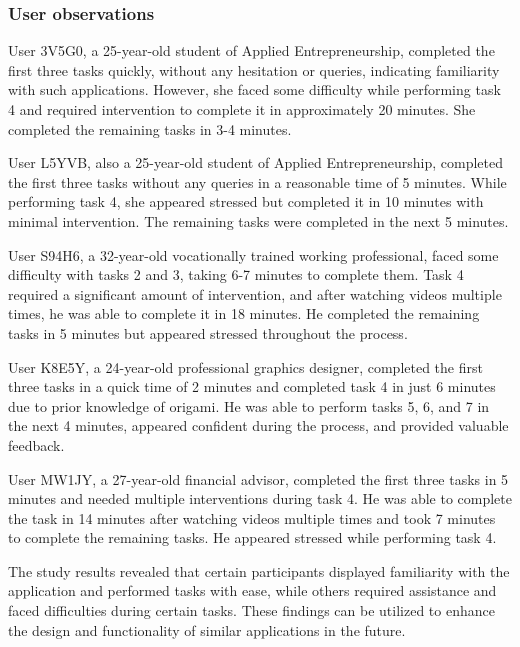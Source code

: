 \documentclass[conference,onecolumn]{IEEEtran}
\begin{document}
        \subsubsection{User observations}\hfill
            
            User 3V5G0, a 25-year-old student of Applied Entrepreneurship, completed the first three tasks quickly, without any hesitation or queries, indicating familiarity with such applications. However, she faced some difficulty while performing task 4 and required intervention to complete it in approximately 20 minutes. She completed the remaining tasks in 3-4 minutes.

            User L5YVB, also a 25-year-old student of Applied Entrepreneurship, completed the first three tasks without any queries in a reasonable time of 5 minutes. While performing task 4, she appeared stressed but completed it in 10 minutes with minimal intervention. The remaining tasks were completed in the next 5 minutes.

            User S94H6, a 32-year-old vocationally trained working professional, faced some difficulty with tasks 2 and 3, taking 6-7 minutes to complete them. Task 4 required a significant amount of intervention, and after watching videos multiple times, he was able to complete it in 18 minutes. He completed the remaining tasks in 5 minutes but appeared stressed throughout the process.

            User K8E5Y, a 24-year-old professional graphics designer, completed the first three tasks in a quick time of 2 minutes and completed task 4 in just 6 minutes due to prior knowledge of origami. He was able to perform tasks 5, 6, and 7 in the next 4 minutes, appeared confident during the process, and provided valuable feedback.

            User MW1JY, a 27-year-old financial advisor, completed the first three tasks in 5 minutes and needed multiple interventions during task 4. He was able to complete the task in 14 minutes after watching videos multiple times and took 7 minutes to complete the remaining tasks. He appeared stressed while performing task 4.

            The study results revealed that certain participants displayed familiarity with the application and performed tasks with ease, while others required assistance and faced difficulties during certain tasks. These findings can be utilized to enhance the design and functionality of similar applications in the future.
            
\end{document}
